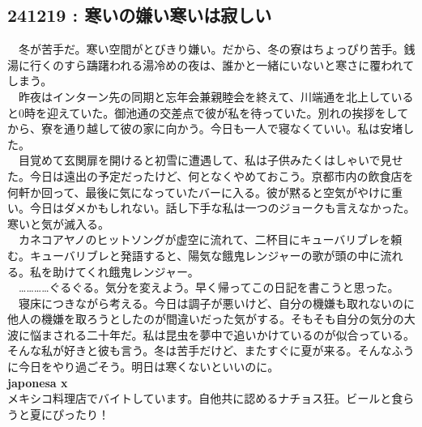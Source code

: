 \begin{myboxnote}
\subsection{241219 : 寒いの嫌い寒いは寂しい}
\noindent
　冬が苦手だ。寒い空間がとびきり嫌い。だから、冬の寮はちょっぴり苦手。銭湯に行くのすら躊躇われる湯冷めの夜は、誰かと一緒にいないと寒さに覆われてしまう。\\
　昨夜はインターン先の同期と忘年会兼親睦会を終えて、川端通を北上していると0時を迎えていた。御池通の交差点で彼が私を待っていた。別れの挨拶をしてから、寮を通り越して彼の家に向かう。今日も一人で寝なくていい。私は安堵した。\\
　目覚めて玄関扉を開けると初雪に遭遇して、私は子供みたくはしゃいで見せた。今日は遠出の予定だったけど、何となくやめておこう。京都市内の飲食店を何軒か回って、最後に気になっていたバーに入る。彼が黙ると空気がやけに重い。今日はダメかもしれない。話し下手な私は一つのジョークも言えなかった。寒いと気が滅入る。\\
　カネコアヤノのヒットソングが虚空に流れて、二杯目にキューバリブレを頼む。キューバリブレと発語すると、陽気な餓鬼レンジャーの歌が頭の中に流れる。私を助けてくれ餓鬼レンジャー。\\
　…………ぐるぐる。気分を変えよう。早く帰ってこの日記を書こうと思った。\\
　寝床につきながら考える。今日は調子が悪いけど、自分の機嫌も取れないのに他人の機嫌を取ろうとしたのが間違いだった気がする。そもそも自分の気分の大波に悩まされる二十年だ。私は昆虫を夢中で追いかけているのが似合っている。そんな私が好きと彼も言う。冬は苦手だけど、またすぐに夏が来る。そんなふうに今日をやり過ごそう。明日は寒くないといいのに。\\

\vspace{1mm}
\noindent
\textbf{japonesa x}\\
メキシコ料理店でバイトしています。自他共に認めるナチョス狂。ビールと食らうと夏にぴったり！

\end{myboxnote}
\vspace{1em}

